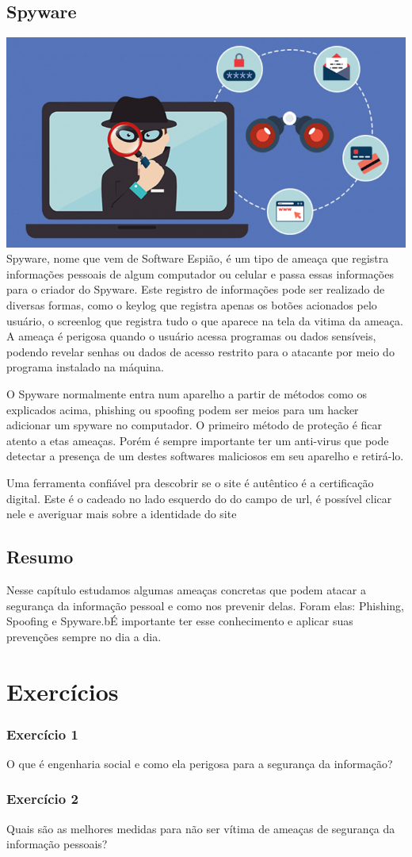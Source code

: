 \section{Spyware}
\includegraphics[width=\textwidth]{img/spyware.png}
Spyware, nome que vem de Software Espião, é um tipo de ameaça que registra informações pessoais de algum computador ou celular e passa essas informações para o criador do Spyware. Este registro de informações pode ser realizado de diversas formas, como o keylog que registra apenas os botões acionados pelo usuário, o screenlog que registra tudo o que aparece na tela da vitima da ameaça. A ameaça é perigosa quando o usuário acessa programas ou dados sensíveis, podendo revelar senhas ou dados de acesso restrito para o atacante por meio do programa instalado na máquina.

O Spyware normalmente entra num aparelho a partir de métodos como os explicados acima, phishing ou spoofing podem ser meios para um hacker adicionar um spyware no computador. O primeiro método de proteção é ficar atento a etas ameaças. Porém é sempre importante ter um anti-virus que pode detectar a presença de um destes softwares maliciosos em seu aparelho e retirá-lo.

\begin{atencao}
Uma ferramenta confiável pra descobrir se o site é autêntico é a certificação digital. Este é o cadeado no lado esquerdo do do campo de url, é possível clicar nele e averiguar mais sobre a identidade do site
\end{atencao}

\section{Resumo}
Nesse capítulo estudamos algumas ameaças concretas que podem atacar a segurança da informação pessoal e como nos prevenir delas. Foram elas: Phishing, Spoofing e Spyware.bÉ importante ter esse conhecimento e aplicar suas prevenções sempre no dia a dia.


\chapter{Exercícios}

\subsection*{Exercício 1}

O que é engenharia social e como ela perigosa para a segurança da informação?

\subsection*{Exercício 2}

Quais são as melhores medidas para não ser vítima de ameaças de segurança da informação pessoais?
